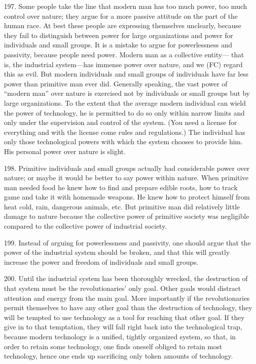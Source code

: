 \documentclass{article}
\begin{document}
197. Some people take the line that modern man has too much power, too much control over 
nature; they argue for a more passive attitude on the part of the human race. At best these people 
are expressing themselves unclearly, because they fail to distinguish between power for large 
organizations and power for individuals and small groups. It is a mistake to argue for 
powerlessness and passivity, because people need power. Modern man as a collective entity—
that is, the industrial system—has immense power over nature, and we (FC) regard this as evil. But 
modern individuals and small groups of individuals have far less power than primitive man ever 
did. Generally speaking, the vast power of “modern man” over nature is exercised not by 
individuals or small groups but by large organizations. To the extent that the average modern 
individual can wield the power of technology, he is permitted to do so only within narrow limits 
and only under the supervision and control of the system. (You need a license for everything and 
with the license come rules and regulations.) The individual has only those technological powers 
with which the system chooses to provide him. His personal power over nature is slight. \vspace{\baselineskip}

198. Primitive individuals and small groups actually had considerable power over nature; or
maybe it would be better to say power within nature. When primitive man needed food he knew 
how to find and prepare edible roots, how to track game and take it with homemade weapons. He 
knew how to protect himself from heat cold, rain, dangerous animals, etc. But primitive man did 
relatively little damage to nature because the collective power of primitive society was negligible 
compared to the collective power of industrial society. \vspace{\baselineskip}

199. Instead of arguing for powerlessness and passivity, one should argue that the power of the 
industrial system should be broken, and that this will greatly increase the power and freedom of 
individuals and small groups. \vspace{\baselineskip}

200. Until the industrial system has been thoroughly wrecked, the destruction of that system must 
be the revolutionaries’ only goal. Other goals would distract attention and energy from the main 
goal. More importantly if the revolutionaries permit themselves to have any other goal than the 
destruction of technology, they will be tempted to use technology as a tool for reaching that other 
goal. If they give in to that temptation, they will fall right back into the technological trap, because 
modern technology is a unified, tightly organized system, so that, in order to retain some 
technology, one finds oneself obliged to retain most technology, hence one ends up sacrificing 
only token amounts of technology. \vspace{\baselineskip}
\end{document}

